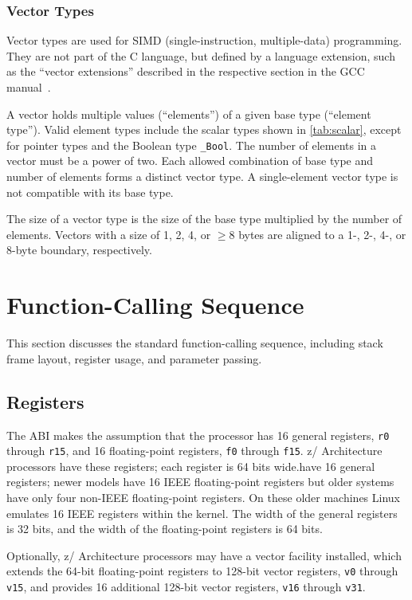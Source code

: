 \documentclass[USenglish,fontsize=11pt,twoside,%
  toc=bib,toc=idx,toc=graduated,numbers=noendperiod,
  bookmarks=true,
  bookmarksnumbered=true,
  bookmarksopen=true,
  bookmarksopenlevel=1,
  breaklinks=true,
  colorlinks=true,
  linkcolor=black,
  pdfpagelayout={TwoPageRight},
  pdfusetitle=true
]{scrreprt}
\newcommand{\ARCH}{z/\kern-1pt Ar\-chi\-tec\-ture}
\newcommand{\ARCH}{ESA/390}
\begin{document}
\subsubsection{Vector Types}
Vector types are used for SIMD (single-instruction,
multiple-data) programming.  They are not part of the C language, but
defined by a language extension, such as the ``vector extensions''
described in the respective section in the GCC manual~\cite{gnu-vec}.

A vector holds multiple values (``elements'') of a given
base type (``element type'').  Valid element types include the scalar
types shown in \cref{tab:scalar}, except for pointer types and the Boolean
type \texttt{\_Bool}.  The number of elements in a vector must be a power
of two.  Each allowed combination of base type and number of elements
forms a distinct vector type.  A single-element vector type is not
compatible with its base type.

The size of a vector type is the size of the base type multiplied by the
number of elements.  Vectors with a size of 1, 2, 4, or $\ge 8$ bytes are
aligned to a 1-, 2-, 4-, or 8-byte boundary, respectively.

\section{Function-Calling Sequence}
This section discusses the standard function-calling sequence,
including stack frame layout, register usage, and parameter passing.

\subsection{Registers}
The ABI makes the assumption that the processor has 16 general registers,
\texttt{r0} through \texttt{r15}, and 16 floating-point registers,
\texttt{f0} through \texttt{f15}.  \ARCH{} processors {\ifzseries have
  these registers; each register is 64 bits wide.\else have 16 general
  registers; newer models have 16 IEEE floating-point registers but older
  systems have only four non-IEEE floating-point registers.  On these
  older machines Linux emulates 16 IEEE registers within the kernel.  The
  width of the general registers is 32 bits, and the width of the
  floating-point registers is 64 bits.\fi}%

Optionally, \ARCH{} processors may have a vector facility installed, which
extends the 64-bit floating-point registers to 128-bit vector registers,
\texttt{v0} through \texttt{v15}, and provides 16 additional 128-bit
vector registers, \texttt{v16} through \texttt{v31}.
\end{document}
